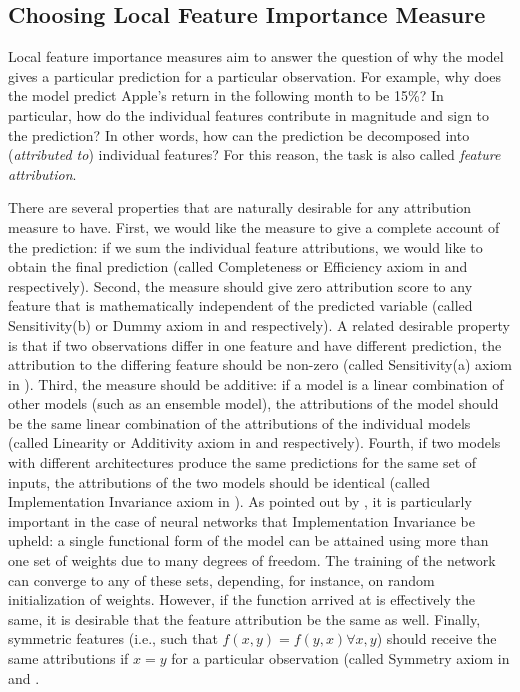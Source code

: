 				
		\subsection{Choosing Local Feature Importance Measure}
			Local feature importance measures aim to answer the question of why the model gives a particular prediction for a particular observation. For example, why does the model predict Apple's return in the following month to be 15\%? In particular, how do the individual features contribute in magnitude and sign to the prediction? In other words, how can the prediction be decomposed into (\textit{attributed to}) individual features? For this reason, the task is also called \textit{feature attribution}.  
			
			There are several properties that are naturally desirable for any attribution measure to have. First, we would like the measure to give a complete account of the prediction: if we sum the individual feature attributions, we would like to obtain the final prediction (called Completeness or Efficiency axiom in \cite{sundararajan2017axiomatic} and \cite{molnar2020interpretable} respectively). Second, the measure should give zero attribution score to any feature that is mathematically independent of the predicted variable (called Sensitivity(b) or Dummy axiom in \cite{sundararajan2017axiomatic} and \cite{molnar2020interpretable} respectively). A related desirable property is that if two observations differ in one feature and have different prediction, the attribution to the differing feature should be non-zero (called Sensitivity(a) axiom in \cite{sundararajan2017axiomatic}). Third, the measure should be additive: if a model is a linear combination of other models (such as an ensemble model), the attributions of the model should be the same linear combination of the attributions of the individual models (called Linearity or Additivity axiom in \cite{sundararajan2017axiomatic} and \cite{molnar2020interpretable} respectively). Fourth, if two models with different architectures produce the same predictions for the same set of inputs, the attributions of the two models should be identical (called Implementation Invariance axiom in \cite{sundararajan2017axiomatic}). As pointed out by \cite{sundararajan2017axiomatic}, it is particularly important in the case of neural networks that Implementation Invariance be upheld: a single functional form of the model can be attained using more than one set of weights due to many degrees of freedom. The training of the network can converge to any of these sets, depending, for instance, on random initialization of weights. However, if the function arrived at is effectively the same, it is desirable that the feature attribution be the same as well. Finally, symmetric features (i.e., such that $f(x,y) = f(y,x) \forall x, y$) should receive the same attributions if $x=y$ for a particular observation (called Symmetry axiom in \cite{shrikumar2017learning} and  \cite{molnar2020interpretable}. 
			

